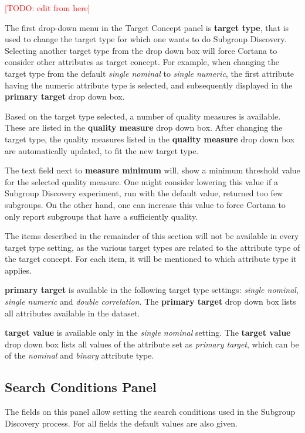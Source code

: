 \documentclass{article}
\newcommand{\todo}[1]{\textcolor{red}{[TODO: #1]}}
\begin{document}
\todo{edit from here}

The first drop-down menu in the Target Concept panel is 
{\bf target type}, that is used to change the target type
for which one wants to do Subgroup Discovery.  Selecting another target type
from the drop down box will force Cortana to consider other attributes as
target concept.  For example, when changing the target type from the default
\emph{single nominal} to \emph{single numeric}, the first attribute having
the numeric attribute type is selected, and subsequently displayed in the
{\bf primary target} drop down box.

Based on the target type selected, a number of quality measures is available.
These are listed in the {\bf quality measure} drop down box.
After changing the target type, the quality measures listed in the {\bf quality measure} drop down box are automatically updated, to fit the new target type.

The text field next to {\bf measure minimum} will, show a minimum threshold value for the selected quality measure.
One might consider lowering this value if a Subgroup Discovery experiment, run with the default value, returned too few subgroups.
On the other hand, one can increase this value to force Cortana to only report subgroups that have a sufficiently quality.

The items described in the remainder of this section will not be available in every target type setting, as the various target types are related to the attribute type of the target concept.
For each item, it will be mentioned to which attribute type it applies.

\textbf{primary target} is available in the following target type settings: \emph{single nominal}, \emph{single numeric} and \emph{double correlation}.
The {\bf primary target} drop down box lists all attributes available in the dataset.

\textbf{target value} is available only in the \emph{single nominal} setting.
The {\bf target value} drop down box lists all values of the attribute set as \emph{primary target}, which can be of the \emph{nominal} and \emph{binary} attribute type.

\subsection{Search Conditions Panel}
\label{sec:searchconditions}

The fields on this panel allow setting the search conditions used in the Subgroup Discovery process.
For all fields the default values are also given.
\end{document}
